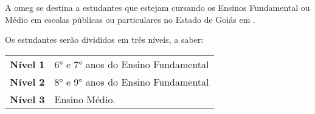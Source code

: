 \begin{article}
  A \acrshort{omeg} se destina a estudantes que estejam cursando os Ensinos
  Fundamental ou Médio em escolas públicas ou particulares no Estado de Goiás
  em \year.
\end{article}

\begin{article}
  Os estudantes serão divididos em três níveis, a saber:
  \begin{table}[H]
    \centering
    \begin{tabular}{ll}
      \textbf{Nível 1} & 6° e 7° anos do Ensino Fundamental \\
      \textbf{Nível 2} & 8° e 9° anos do Ensino Fundamental \\
      \textbf{Nível 3} & Ensino Médio.
    \end{tabular}
  \end{table}
\end{article}
